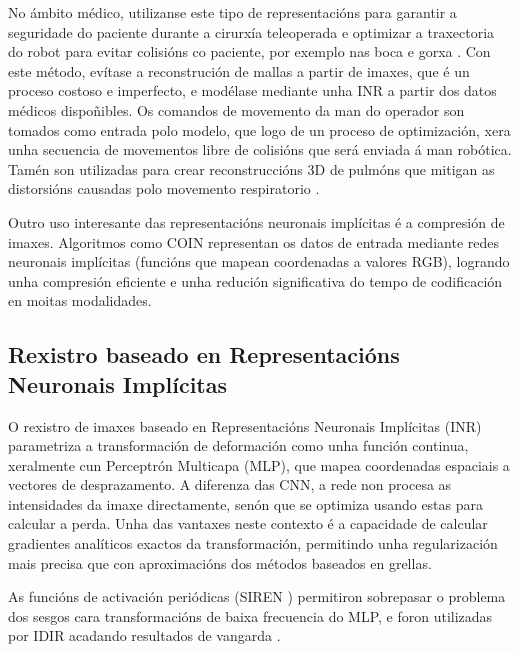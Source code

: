 No ámbito médico, utilizanse este tipo de representacións para garantir a seguridade do paciente durante a cirurxía teleoperada e optimizar a traxectoria do robot para evitar colisións co paciente, por exemplo nas boca e gorxa \cite{teleoperatdrob}.
Con este método, evítase a reconstrución de mallas a partir de imaxes, que é un proceso costoso e imperfecto, e modélase mediante unha INR a partir dos datos médicos dispoñibles.
Os comandos de movemento da man do operador son tomados como entrada polo modelo, que logo de un proceso de optimización, xera unha secuencia de movementos libre de colisións que será enviada á man robótica.
Tamén son utilizadas para crear reconstruccións 3D de pulmóns que mitigan as distorsións causadas polo movemento respiratorio \cite{velikova2024implicitneuralrepresentationsbreathingcompensated}.

Outro uso interesante das representacións neuronais implícitas é a compresión de imaxes. Algoritmos como COIN \cite{coin} representan os datos de entrada mediante redes neuronais implícitas (funcións que mapean coordenadas a valores RGB), logrando unha compresión eficiente e unha redución significativa do tempo de codificación en moitas modalidades.

\subsection{Rexistro baseado en Representacións Neuronais Implícitas}
\label{subsec:Rexistro_baseado_en_INRs}

O rexistro de imaxes baseado en Representacións Neuronais Implícitas (INR) parametriza a transformación de deformación como unha función continua, xeralmente cun Perceptrón Multicapa (MLP), que mapea coordenadas espaciais a vectores de desprazamento. A diferenza das CNN, a rede non procesa as intensidades da imaxe directamente, senón que se optimiza usando estas para calcular a perda. Unha das vantaxes neste contexto é a capacidade de calcular gradientes analíticos exactos da transformación, permitindo unha regularización mais precisa que con aproximacións dos métodos baseados en grellas.  

As funcións de activación periódicas (SIREN \cite{sitzmann2020implicitneuralrepresentationsperiodic}) permitiron sobrepasar o problema dos sesgos cara transformacións de baixa frecuencia do MLP, e foron utilizadas por IDIR acadando resultados de vangarda \cite{wolterink2021implicit}.  


